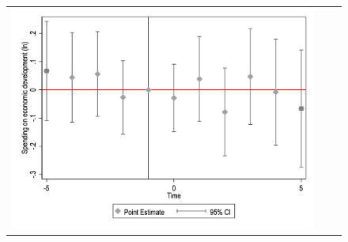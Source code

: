 \begin{figure}[!ht]
\begin{tabular}{@{}ccc@{}}
\begin{minipage}[t]{0.32\textwidth}
            \includegraphics[width=\linewidth]{images/pop_100000/eventdd_ln_q4_11_step1.jpg}
            \label{fig:ecodev}
        \end{minipage} \\[10pt]


\end{tabular}
\end{figure}
